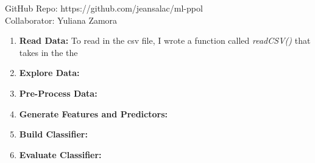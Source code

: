 \documentclass[letterpaper,12pt]{article}
\begin{document}
\maketitle
\begin{center}
GitHub Repo: https://github.com/jeansalac/ml-ppol \\
Collaborator: Yuliana Zamora
\end{center}
\begin{enumerate}
\item \textbf{Read Data:} To read in the csv file, I wrote a function called \textit{readCSV()} that takes in the the 
\item \textbf{Explore Data:}
\item \textbf{Pre-Process Data:}
\item \textbf{Generate Features and Predictors:}
\item \textbf{Build Classifier:}
\item \textbf{Evaluate Classifier:}
\end{enumerate}
\end{document}
